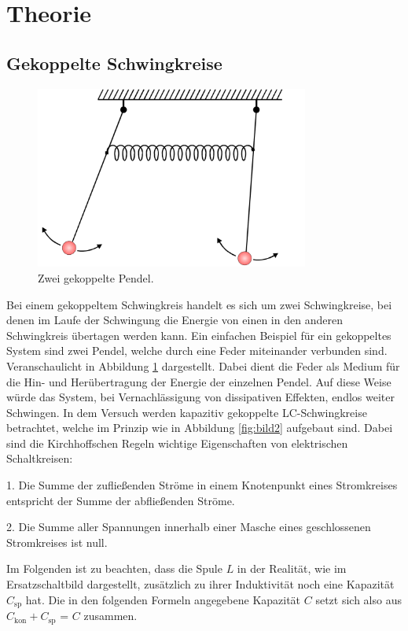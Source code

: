 \section{Theorie}
\label{sec:Theorie}

\subsection{Gekoppelte Schwingkreise} 
\label{sub:Gekoppelte Schwingkreise}


\begin{figure}

    \centering
    \includegraphics[height=6.0cm]{data/Bild1.png}
    \caption{Zwei gekoppelte Pendel.}
    \label{fig:bild1}
\end{figure}

Bei einem gekoppeltem Schwingkreis handelt es sich um zwei Schwingkreise, bei denen im Laufe der Schwingung
die Energie von einen in den anderen Schwingkreis übertagen werden kann. Ein einfachen Beispiel für ein gekoppeltes
System sind zwei Pendel, welche durch eine Feder miteinander verbunden sind. Veranschaulicht in Abbildung \ref{fig:bild1} dargestellt. Dabei dient die Feder als Medium für die Hin- und Herübertragung der Energie der einzelnen Pendel.
Auf diese Weise würde das System, bei Vernachlässigung von dissipativen Effekten, endlos weiter Schwingen.
In dem Versuch werden kapazitiv gekoppelte LC-Schwingkreise betrachtet, welche im Prinzip wie in Abbildung \ref{fig:bild2}
aufgebaut sind. Dabei sind die Kirchhoffschen Regeln wichtige Eigenschaften von elektrischen Schaltkreisen: 

1.  Die Summe der zufließenden Ströme in einem Knotenpunkt eines Stromkreises entspricht
    der Summe der abfließenden Ströme.

2.  Die Summe aller Spannungen innerhalb einer Masche eines geschlossenen Stromkreises
    ist null.


Im Folgenden ist zu beachten, dass die Spule $L$ in der Realität, wie im Ersatzschaltbild dargestellt, zusätzlich zu ihrer Induktivität noch eine Kapazität
$C_\text{sp}$ hat. Die in den folgenden Formeln angegebene Kapazität $C$ setzt sich also aus $C_\text{kon} + C_\text{sp}$ = $C$ 
zusammen. 

